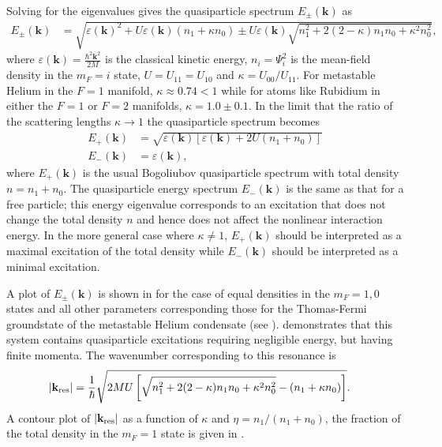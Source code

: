 Solving for the eigenvalues gives the quasiparticle spectrum $E_\pm(\mathbf{k})$ as
\begin{align}
    E_\pm(\mathbf{k}) &= \sqrt{\varepsilon(\mathbf{k})^2 + U \varepsilon(\mathbf{k}) (n_1 + \kappa n_0) \pm U \varepsilon(\mathbf{k})\sqrt{n_1^2 + 2 (2 - \kappa) n_1 n_0 + \kappa^2 n_0^2} },
    \label{Peaks:QuasiparticleSpectrum}
\end{align}
where $\displaystyle\varepsilon(\mathbf{k}) = \frac{\hbar^2 \mathbf{k}^2}{2M}$ is the classical kinetic energy, $n_i=\Psi_i^2$ is the mean-field density in the $m_F=i$ state, $U = U_{11} = U_{10}$ and $\kappa = U_{00}/U_{11}$. For metastable Helium in the $F=1$ manifold, $\kappa \approx 0.74 < 1$ while for atoms like Rubidium in either the $F=1$ or $F=2$ manifolds, $\kappa = 1.0 \pm 0.1$.  In the limit that the ratio of the scattering lengths $\kappa \rightarrow 1$ the quasiparticle spectrum becomes
\begin{align}
    E_+(\mathbf{k}) &= \sqrt{\varepsilon(\mathbf{k})\left[\varepsilon(\mathbf{k}) + 2 U (n_1 + n_0) \right]} \label{Peaks:EPlusSimple}\\
    E_-(\mathbf{k}) &= \varepsilon(\mathbf{k}), \label{Peaks:EMinusSimple}
\end{align}
where $E_+(\mathbf{k})$ is the usual Bogoliubov quasiparticle spectrum \citep{Bogoliubov:1947} with total density $n = n_1 + n_0$. The quasiparticle energy spectrum $E_-(\mathbf{k})$ is the same as that for a free particle; this energy eigenvalue corresponds to an excitation that does not change the total density $n$ and hence does not affect the nonlinear interaction energy. In the more general case where $\kappa \neq 1$, $E_+(\mathbf{k})$ should be interpreted as a maximal excitation of the total density while $E_-(\mathbf{k})$ should be interpreted as a minimal excitation.

A plot of $E_\pm(\mathbf{k})$ is shown in  for the case of equal densities in the $m_F=1, 0$ states and all other parameters corresponding those for the Thomas-Fermi groundstate of the metastable Helium condensate (see ).  demonstrates that this system contains quasiparticle excitations requiring negligible energy, but having finite momenta. The wavenumber corresponding to this resonance is
\begin{align}
    \abs{\mathbf{k}_\text{res}} &= \frac{1}{\hbar} \sqrt{2 M U \left[\sqrt{n_1^2 + 2(2 - \kappa)n_1 n_0 + \kappa^2 n_0^2} - (n_1 + \kappa n_0)\right]}. \label{Peaks:ResonantMomentum}
\end{align}
A contour plot of $\left|\mathbf{k}_\text{res}\right|$ as a function of $\kappa$ and $\eta = n_1/(n_1 + n_0)$, the fraction of the total density in the $m_F=1$ state is given in .

